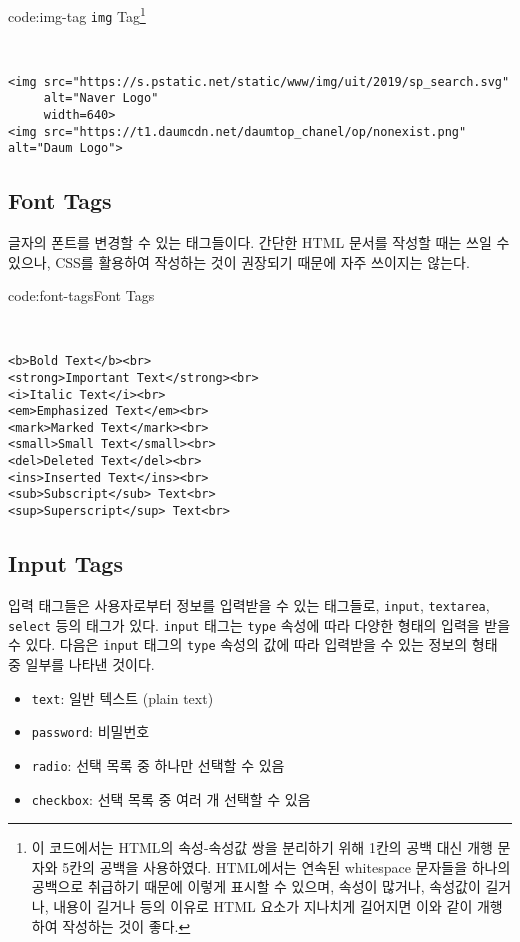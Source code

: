 \begin{codeenv}{code:img-tag}
    {\texttt{img} Tag\footnote{이 코드에서는 HTML의 속성-속성값 쌍을 분리하기 위해 1칸의 공백 대신 개행 문자와 5칸의 공백을 사용하였다. HTML에서는 연속된 whitespace 문자들을 하나의 공백으로 취급하기 때문에 이렇게 표시할 수 있으며, 속성이 많거나, 속성값이 길거나, 내용이 길거나 등의 이유로 HTML 요소가 지나치게 길어지면 이와 같이 개행하여 작성하는 것이 좋다.}}
    \begin{verbatim}


<img src="https://s.pstatic.net/static/www/img/uit/2019/sp_search.svg"
     alt="Naver Logo"
     width=640>
<img src="https://t1.daumcdn.net/daumtop_chanel/op/nonexist.png" alt="Daum Logo">
\end{verbatim}
\end{codeenv}

\subsection*{Font Tags}
글자의 폰트를 변경할 수 있는 태그들이다. 간단한 HTML 문서를 작성할 때는 쓰일 수 있으나, CSS를 활용하여 작성하는 것이 권장되기 때문에 자주 쓰이지는 않는다. 

\begin{codeenv}{code:font-tags}{Font Tags}\begin{verbatim}


<b>Bold Text</b><br>
<strong>Important Text</strong><br>
<i>Italic Text</i><br>
<em>Emphasized Text</em><br>
<mark>Marked Text</mark><br>
<small>Small Text</small><br>
<del>Deleted Text</del><br>
<ins>Inserted Text</ins><br>
<sub>Subscript</sub> Text<br>
<sup>Superscript</sup> Text<br>
\end{verbatim}
\end{codeenv}

\subsection*{Input Tags}
입력 태그들은 사용자로부터 정보를 입력받을 수 있는 태그들로, \texttt{input}, \texttt{textarea}, \texttt{select} 등의 태그가 있다. \texttt{input} 태그는 \texttt{type} 속성에 따라 다양한 형태의 입력을 받을 수 있다. 다음은 \texttt{input} 태그의 \texttt{type} 속성의 값에 따라 입력받을 수 있는 정보의 형태 중 일부를 나타낸 것이다.

\begin{itemize}
    \item \texttt{text}: 일반 텍스트 (plain text)
    \item \texttt{password}: 비밀번호
    \item \texttt{radio}: 선택 목록 중 하나만 선택할 수 있음
    \item \texttt{checkbox}: 선택 목록 중 여러 개 선택할 수 있음
\end{itemize}

